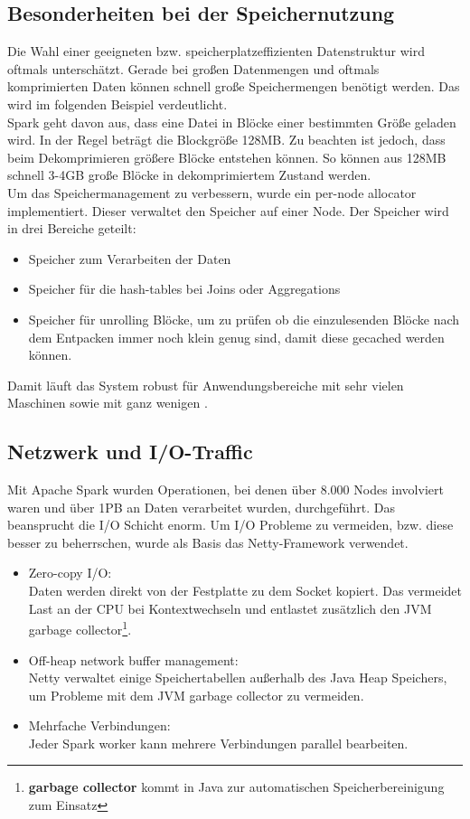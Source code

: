 \subsection{Besonderheiten bei der Speichernutzung}
Die Wahl einer geeigneten bzw. speicherplatzeffizienten Datenstruktur wird oftmals unterschätzt. Gerade bei großen Datenmengen und oftmals komprimierten Daten können schnell große Speichermengen benötigt werden. Das wird im folgenden Beispiel verdeutlicht.\\
Spark geht davon aus, dass eine Datei in Blöcke einer bestimmten Größe geladen wird. In der Regel beträgt die Blockgröße 128MB. Zu beachten ist jedoch, dass beim Dekomprimieren größere Blöcke entstehen können. So können aus 128MB schnell 3-4GB große Blöcke in dekomprimiertem Zustand werden. \\ 

\noindent
Um das Speichermanagement zu verbessern, wurde ein per-node allocator implementiert. Dieser verwaltet den Speicher auf einer Node. 
Der Speicher wird in drei Bereiche geteilt:
\begin{itemize}
	\item Speicher zum Verarbeiten der Daten
	\item Speicher für die hash-tables bei Joins oder Aggregations
	\item Speicher für \glqq{}unrolling\grqq{} Blöcke, um zu prüfen ob die einzulesenden Blöcke nach dem Entpacken immer noch klein genug sind, damit diese gecached werden können.
\end{itemize}
\noindent
Damit läuft das System robust für Anwendungsbereiche mit sehr vielen Maschinen sowie mit ganz wenigen \cite{ADD+15}.

\subsection{Netzwerk und I/O-Traffic}

Mit Apache Spark wurden Operationen, bei denen über 8.000 Nodes involviert waren und über 1PB an Daten verarbeitet wurden, durchgeführt. Das beansprucht die I/O Schicht enorm.
Um I/O Probleme zu vermeiden, bzw. diese besser zu beherrschen, wurde als Basis das Netty-Framework verwendet.
\begin{itemize}
	\item Zero-copy I/O:\\
	Daten werden direkt von der Festplatte zu dem Socket kopiert. Das vermeidet Last an der CPU bei Kontextwechseln und entlastet zusätzlich den JVM garbage collector\footnote{\textbf{garbage collector} kommt in Java zur automatischen Speicherbereinigung zum Einsatz}.
	\item Off-heap network buffer management:\\
	Netty verwaltet einige Speichertabellen außerhalb des Java Heap Speichers, um Probleme mit dem JVM garbage collector zu vermeiden.
	\item Mehrfache Verbindungen:\\
	Jeder Spark worker kann mehrere Verbindungen parallel bearbeiten.
\end{itemize}


